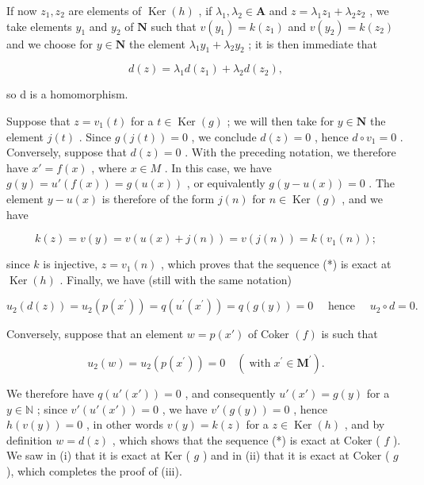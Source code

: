 If now \(z_{1}, z_{2}\) are elements of \(\operatorname{Ker}(h)\) , if \(\lambda_{1}, \lambda_{2} \in \mathbf{A}\) and \(z = \lambda_{1} z_{1} + \lambda_{2} z_{2}\) , we take elements \(y_{1}\) and \(y_{2}\) of \(\mathbf{N}\) such that \(v(y_{1}) = k(z_{1})\) and \(v(y_{2}) = k(z_{2})\) and we choose for \(y \in \mathbf{N}\) the element \(\lambda_{1} y_{1} + \lambda_{2} y_{2}\) ; it is then immediate that

\[
d (z) = \lambda_ {1} d (z _ {1}) + \lambda_ {2} d (z _ {2}),
\]

so d is a homomorphism.

Suppose that \(z = v_1(t)\) for a \(t \in \operatorname{Ker}(g)\) ; we will then take for \(y \in \mathbf{N}\) the element \(j(t)\) . Since \(g(j(t)) = 0\) , we conclude \(d(z) = 0\) , hence \(d \circ v_1 = 0\) . Conversely, suppose that \(d(z) = 0\) . With the preceding notation, we therefore have \(x' = f(x)\) , where \(x \in M\) . In this case, we have \(g(y) = u'(f(x)) = g(u(x))\) , or equivalently \(g(y - u(x)) = 0\) . The element \(y - u(x)\) is therefore of the form \(j(n)\) for \(n \in \operatorname{Ker}(g)\) , and we have

\[
k (z) = v (y) = v (u (x) + j (n)) = v (j (n)) = k \left(v _ {1} (n)\right);
\]

since \(k\) is injective, \(z = v_{1}(n)\) , which proves that the sequence (*) is exact at \(\operatorname{Ker}(h)\) . Finally, we have (still with the same notation)

\[
u _ {2} (d (z)) = u _ {2} \left(p \left(x ^ {\prime}\right)\right) = q \left(u ^ {\prime} \left(x ^ {\prime}\right)\right) = q (g (y)) = 0 \quad \text {   hence   } \quad u _ {2} \circ d = 0.
\]

Conversely, suppose that an element \(w = p(x')\) of Coker \((f)\) is such that

\[
u _ {2} (w) = u _ {2} \left(p \left(x ^ {\prime}\right)\right) = 0 \quad \left(\operatorname{with} x ^ {\prime} \in \mathbf {M} ^ {\prime}\right).
\]

We therefore have \(q(u'(x')) = 0\) , and consequently \(u'(x') = g(y)\) for a \(y \in \mathbb{N}\) ; since \(v'(u'(x')) = 0\) , we have \(v'(g(y)) = 0\) , hence \(h(v(y)) = 0\) , in other words \(v(y) = k(z)\) for a \(z \in \operatorname{Ker}(h)\) , and by definition \(w = d(z)\) , which shows that the sequence (*) is exact at Coker ( \(f\) ). We saw in (i) that it is exact at Ker ( \(g\) ) and in (ii) that it is exact at Coker ( \(g\) ), which completes the proof of (iii).

